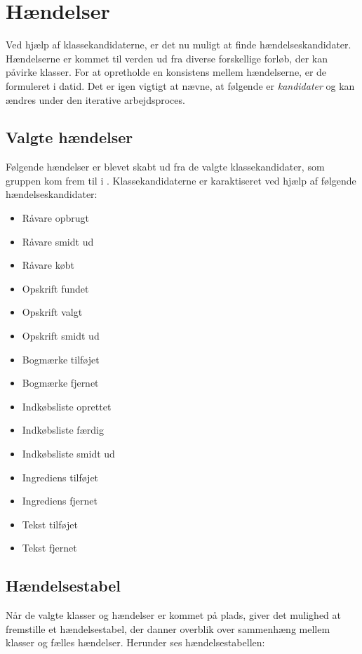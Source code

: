 \section{Hændelser}
\label{sec:haendelser}
Ved hjælp af klassekandidaterne, er det nu muligt at finde hændelseskandidater. Hændelserne er kommet til verden ud fra diverse forskellige forløb, der kan påvirke klasser. For at opretholde en konsistens mellem hændelserne, er de formuleret i datid. Det er igen vigtigt at nævne, at følgende er \emph{kandidater} og kan ændres under den iterative arbejdsproces. 

\subsection{Valgte hændelser}
Følgende hændelser er blevet skabt ud fra de valgte klassekandidater, som gruppen kom frem til i . Klassekandidaterne er karaktiseret ved hjælp af følgende hændelseskandidater: 

\begin{itemize} [noitemsep]
\item Råvare opbrugt
\item Råvare smidt ud
\item Råvare købt
\item Opskrift fundet
\item Opskrift valgt
\item Opskrift smidt ud
\item Bogmærke tilføjet
\item Bogmærke fjernet
\item Indkøbsliste oprettet
\item Indkøbsliste færdig
\item Indkøbsliste smidt ud
\item Ingrediens tilføjet
\item Ingrediens fjernet
\item Tekst tilføjet
\item Tekst fjernet
\end{itemize}

\subsection{Hændelsestabel}
Når de valgte klasser og hændelser er kommet på plads, giver det mulighed at fremstille et hændelsestabel, der danner overblik over sammenhæng mellem klasser og fælles hændelser. Herunder ses hændelsestabellen:



